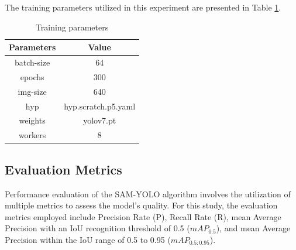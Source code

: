 \documentclass[aic]{iosart2x}
\begin{document}

The training parameters utilized in this experiment are presented in Table \ref{tab:training_parameters}.

\begin{table}[htbp]
    
    \centering
    
    \caption{Training parameters}
    
    \label{tab:training_parameters}
    
    \begin{tabular}{cc}
        
        \toprule
        
 Parameters & Value               \\
        
        \midrule
        
 batch-size & 64                  \\
        
 epochs     & 300                 \\
        
 img-size   & 640                 \\
        
 hyp        & hyp.scratch.p5.yaml \\
        
 weights    & yolov7.pt           \\
        
 workers    & 8                   \\
        
        \bottomrule
        
    \end{tabular}
    
\end{table}

\subsection{Evaluation Metrics}

Performance evaluation of the SAM-YOLO algorithm involves the utilization of multiple metrics to assess the model's quality. For this study, the evaluation metrics employed include Precision Rate (P), Recall Rate (R), mean Average Precision with an IoU recognition threshold of 0.5 ($mAP_{0.5}$), and mean Average Precision within the IoU range of 0.5 to 0.95 ($mAP_{0.5:0.95}$).
\end{document}
